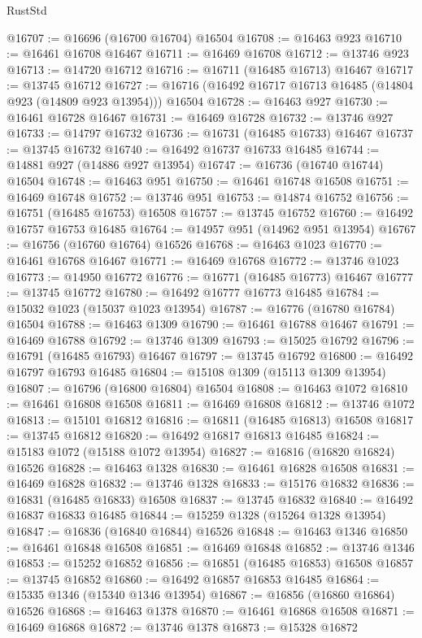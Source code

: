 \begin{lexlean}{RustStd}
\begin{coremodule}
@16707 := @16696 (@16700 @16704) @16504
@16708 := @16463 @923
@16710 := @16461 @16708 @16467
@16711 := @16469 @16708
@16712 := @13746 @923
@16713 := @14720 @16712
@16716 := @16711 (@16485 @16713) @16467
@16717 := @13745 @16712
@16727 := @16716 (@16492 @16717 @16713 @16485 (@14804 @923 (@14809 @923 @13954))) @16504
@16728 := @16463 @927
@16730 := @16461 @16728 @16467
@16731 := @16469 @16728
@16732 := @13746 @927
@16733 := @14797 @16732
@16736 := @16731 (@16485 @16733) @16467
@16737 := @13745 @16732
@16740 := @16492 @16737 @16733 @16485
@16744 := @14881 @927 (@14886 @927 @13954)
@16747 := @16736 (@16740 @16744) @16504
@16748 := @16463 @951
@16750 := @16461 @16748 @16508
@16751 := @16469 @16748
@16752 := @13746 @951
@16753 := @14874 @16752
@16756 := @16751 (@16485 @16753) @16508
@16757 := @13745 @16752
@16760 := @16492 @16757 @16753 @16485
@16764 := @14957 @951 (@14962 @951 @13954)
@16767 := @16756 (@16760 @16764) @16526
@16768 := @16463 @1023
@16770 := @16461 @16768 @16467
@16771 := @16469 @16768
@16772 := @13746 @1023
@16773 := @14950 @16772
@16776 := @16771 (@16485 @16773) @16467
@16777 := @13745 @16772
@16780 := @16492 @16777 @16773 @16485
@16784 := @15032 @1023 (@15037 @1023 @13954)
@16787 := @16776 (@16780 @16784) @16504
@16788 := @16463 @1309
@16790 := @16461 @16788 @16467
@16791 := @16469 @16788
@16792 := @13746 @1309
@16793 := @15025 @16792
@16796 := @16791 (@16485 @16793) @16467
@16797 := @13745 @16792
@16800 := @16492 @16797 @16793 @16485
@16804 := @15108 @1309 (@15113 @1309 @13954)
@16807 := @16796 (@16800 @16804) @16504
@16808 := @16463 @1072
@16810 := @16461 @16808 @16508
@16811 := @16469 @16808
@16812 := @13746 @1072
@16813 := @15101 @16812
@16816 := @16811 (@16485 @16813) @16508
@16817 := @13745 @16812
@16820 := @16492 @16817 @16813 @16485
@16824 := @15183 @1072 (@15188 @1072 @13954)
@16827 := @16816 (@16820 @16824) @16526
@16828 := @16463 @1328
@16830 := @16461 @16828 @16508
@16831 := @16469 @16828
@16832 := @13746 @1328
@16833 := @15176 @16832
@16836 := @16831 (@16485 @16833) @16508
@16837 := @13745 @16832
@16840 := @16492 @16837 @16833 @16485
@16844 := @15259 @1328 (@15264 @1328 @13954)
@16847 := @16836 (@16840 @16844) @16526
@16848 := @16463 @1346
@16850 := @16461 @16848 @16508
@16851 := @16469 @16848
@16852 := @13746 @1346
@16853 := @15252 @16852
@16856 := @16851 (@16485 @16853) @16508
@16857 := @13745 @16852
@16860 := @16492 @16857 @16853 @16485
@16864 := @15335 @1346 (@15340 @1346 @13954)
@16867 := @16856 (@16860 @16864) @16526
@16868 := @16463 @1378
@16870 := @16461 @16868 @16508
@16871 := @16469 @16868
@16872 := @13746 @1378
@16873 := @15328 @16872

\end{coremodule}
\end{lexlean}
